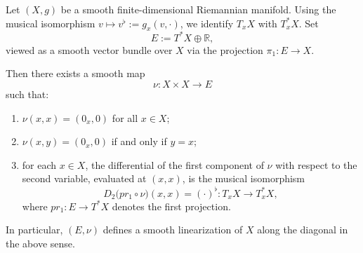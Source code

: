\documentclass[10pt,a4paper]{amsart}
\begin{document}
\begin{Proposition}
\label{prop:linearization-smooth}
Let $(X,g)$ be a smooth finite-dimensional Riemannian manifold.
Using the musical isomorphism $v \mapsto v^\flat := g_x(v,\cdot)$,
we identify $T_xX$ with $T_x^\ast X$.
Set
\[
E := T^\ast X \oplus \mathbb{R},
\]
viewed as a smooth vector bundle over $X$ via the projection 
$\pi_1 : E \to X$.

Then there exists a smooth map
\[
\nu : X\times X \longrightarrow E
\]
such that:
\begin{enumerate}
  \item[(i)] $\nu(x,x) = (0_x,0)$ for all $x\in X$;

  \item[(ii)] $\nu(x,y) = (0_x,0)$ if and only if $y=x$;

  \item[(iii)] for each $x\in X$, the differential of the first component
  of $\nu$ with respect to the second variable, evaluated at $(x,x)$, is
  the musical isomorphism
  \[
    D_2\bigl(pr_1\circ\nu\bigr)(x,x)
    = (\cdot)^\flat : T_xX \longrightarrow T_x^\ast X ,
  \]
  where $pr_1 : E\to T^\ast X$ denotes the first projection.
\end{enumerate}
In particular, $(E,\nu)$ defines a smooth linearization of $X$ along the
diagonal in the above sense.
\end{Proposition}
\end{document}
